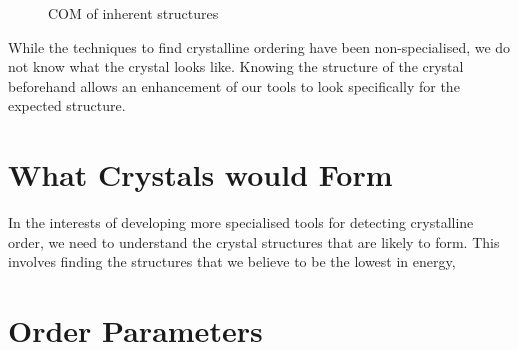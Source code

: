 \begin{figure}
    \caption{COM of inherent structures}
    \label{fig:inherent structures com}
\end{figure}

While the techniques to find crystalline ordering have been non-specialised, we do not know what the crystal looks like. Knowing the structure of the crystal beforehand allows an enhancement of our tools to look specifically for the expected structure.

\section{What Crystals would Form}

In the interests of developing more specialised tools for detecting crystalline order, we need to understand the crystal structures that are likely to form. This involves finding the structures that we believe to be the lowest in energy, 






\section{Order Parameters}



